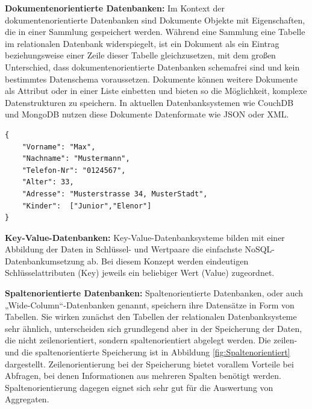 \noindent
{}
\textbf{Dokumentenorientierte Datenbanken:}
Im Kontext der dokumentenorientierte Datenbanken sind Dokumente Objekte mit Eigenschaften, die in einer Sammlung gespeichert werden. 
Während eine Sammlung eine Tabelle im relationalen Datenbank widerspiegelt, ist ein Dokument als ein Eintrag beziehungsweise einer Zeile dieser Tabelle gleichzusetzen, mit dem großen Unterschied, dass dokumentenorientierte Datenbanken schemafrei sind und kein bestimmtes Datenschema voraussetzen. 
Dokumente können weitere Dokumente als Attribut oder in einer Liste einbetten und bieten so die Möglichkeit, komplexe Datenstrukturen zu speichern.  
In aktuellen Datenbanksystemen wie CouchDB und MongoDB nutzen diese Dokumente Datenformate wie JSON oder XML.\\

\begin{lstlisting}
{
	"Vorname": "Max",
	"Nachname": "Mustermann",
	"Telefon-Nr": "0124567",
	"Alter": 33,
	"Adresse": "Musterstrasse 34, MusterStadt",
	"Kinder":  ["Junior","Elenor"]
}
\end{lstlisting}

\noindent
{}
\textbf{Key-Value-Datenbanken:}
Key-Value-Datenbanksysteme bilden mit einer Abbildung der Daten in Schlüssel- und Wertpaare die einfachste NoSQL-Datenbankumsetzung ab. Bei diesem Konzept werden eindeutigen Schlüsselattributen (Key) jeweils ein beliebiger Wert (Value) zugeordnet. %

%    
%
%
%
%
%

\noindent
{}
\textbf{Spaltenorientierte Datenbanken:}
Spaltenorientierte Datenbanken, oder auch „Wide\--Column“-Datenbanken genannt, speichern ihre Datensätze in Form von Tabellen.  Sie wirken zunächst den Tabellen der relationalen Datenbanksysteme sehr ähnlich, unterscheiden sich grundlegend aber in der Speicherung der Daten, die nicht zeilenorientiert, sondern spaltenorientiert abgelegt werden. 
Die zeilen- und die spaltenorientierte Speicherung ist in Abbildung \ref{fig:Spaltenorientiert} dargestellt. Zeilenorientierung bei der Speicherung bietet vorallem Vorteile bei Abfragen, bei denen Informationen aus mehreren Spalten benötigt werden.
Spaltenorientierung dagegen eignet sich sehr gut für die Auswertung von Aggregaten.
\newline


